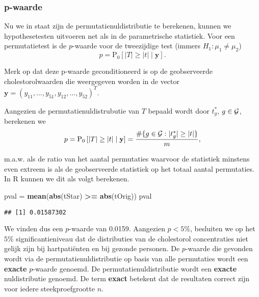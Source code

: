 \documentclass[12pt,dutch,coursenotes]{book}
\newenvironment{Shaded}{\begin{snugshade}}{\end{snugshade}}
\newcommand{\KeywordTok}[1]{\textcolor[rgb]{0.13,0.29,0.53}{\textbf{#1}}}
\newcommand{\StringTok}[1]{\textcolor[rgb]{0.31,0.60,0.02}{#1}}
\newcommand{\OperatorTok}[1]{\textcolor[rgb]{0.81,0.36,0.00}{\textbf{#1}}}
\newcommand{\NormalTok}[1]{#1}
\theoremstyle{definition}
\theoremstyle{definition}
\theoremstyle{definition}
\theoremstyle{remark}
\begin{document}
\subsubsection{p-waarde}\label{p-waarde}

Nu we in staat zijn de permutatienuldistributie te berekenen, kunnen we
hypothesetesten uitvoeren net als in de parametrische statistiek. Voor
een permutatietest is de \(p\)-waarde voor de tweezijdige test (immers
\(H_1: \mu_1 \neq \mu_2\))
\[p=\text{P}_0\left[\vert T\vert \geq \vert t\vert \mid \mathbf{y}\right].\]

Merk op dat deze p-waarde geconditioneerd is op de geobserveerde
cholestorolwaarden die weergegeven worden in de vector
\(\mathbf{y}=(y_{11},\ldots,y_{51},y_{12},\ldots,y_{52})^T\).

Aangezien de permutatienuldistrubutie van \(T\) bepaald wordt door
\(t^*_g\), \(g \in{\cal{G}}\), berekenen we
\[p  = \text{P}_0\left[\left\vert T\right\vert \geq \left\vert t\right\vert \mid \mathbf{y}\right] = \frac{\#\{g\in {\cal{G}}: \vert t^*_g\vert \geq \vert t \vert \}}{m},\]

m.a.w. als de ratio van het aantal permutaties waarvoor de statistiek
minstens even extreem is als de geobserveerde statistiek op het totaal
aantal permutaties. In R kunnen we dit als volgt berekenen.

\begin{Shaded}
\begin{Highlighting}[]
\NormalTok{pval =}\StringTok{ }\KeywordTok{mean}\NormalTok{(}\KeywordTok{abs}\NormalTok{(tStar) }\OperatorTok{>=}\StringTok{ }\KeywordTok{abs}\NormalTok{(tOrig))}
\NormalTok{pval}
\end{Highlighting}
\end{Shaded}

\begin{verbatim}
## [1] 0.01587302
\end{verbatim}

We vinden dus een \(p\)-waarde van 0.0159. Aangezien \(p<5\%\),
besluiten we op het \(5\%\) significantieniveau dat de distributies van
de cholestorol concentraties niet gelijk zijn bij hartpatiënten en bij
gezonde personen. De \(p\)-waarde die gevonden wordt via de
permutatienuldistributie op basis van alle permutaties wordt een
\textbf{exacte} \(p\)-waarde genoemd. De permutatienuldistributie wordt
een \textbf{exacte} nuldistributie genoemd. De term \textbf{exact}
betekent dat de resultaten correct zijn voor iedere steekproefgrootte
\(n\).
\end{document}
